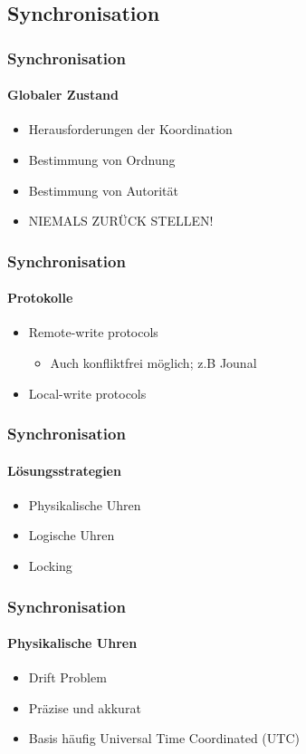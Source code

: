 \subsection{Synchronisation}
\begin{frame}
  \frametitle{Synchronisation}
  \framesubtitle{Globaler Zustand}
  \begin{itemize}
    \item Herausforderungen der Koordination
    \item Bestimmung von Ordnung
    \item Bestimmung von Autorität
    \item NIEMALS ZURÜCK STELLEN!
  \end{itemize}
\end{frame}


\begin{frame}
  \frametitle{Synchronisation}
  \framesubtitle{Protokolle}
  \begin{itemize}
    \item Remote-write protocols
     \begin{itemize}
      \item Auch konfliktfrei möglich; z.B Jounal
     \end{itemize}
    \item Local-write protocols
  \end{itemize}
\end{frame}

\begin{frame}
  \frametitle{Synchronisation}
  \framesubtitle{Lösungsstrategien}
  \begin{itemize}
  \item Physikalische Uhren
  \item Logische Uhren
  \item Locking
  \end{itemize}
\end{frame}

\begin{frame}
  \frametitle{Synchronisation}
  \framesubtitle{Physikalische Uhren}
  \begin{itemize}
  \item Drift Problem
  \item Präzise und akkurat
  \item Basis häufig Universal Time Coordinated (UTC)
  \end{itemize}
\end{frame}

